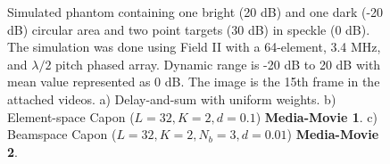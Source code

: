 \documentclass[journal]{IEEEtran}
\newcommand\multimedia[1]{\textbf{{\color{red}#1}}}
\begin{document}
\begin{figure}[!t]
\centerline{
\hfil
{}
\hfil
{}
}
\caption{Simulated phantom containing one bright (20 dB) and one dark (-20 dB) circular area and two point targets (30 dB) in speckle (0 dB). The simulation was done using Field II with a 64-element, 3.4 MHz, and $\lambda/2$ pitch phased array. Dynamic range is -20 dB to 20 dB with mean value represented as 0 dB. The image is the 15th frame in the attached videos. a) Delay-and-sum with uniform weights. b) Element-space Capon ($L=32, K=2, d=0.1$) \multimedia{Media-Movie 1}. c) Beamspace Capon ($L=32, K=2, N_b=3, d=0.01$) \multimedia{Media-Movie 2}.}
\label{fig:phantom}
\end{figure}
\end{document}

